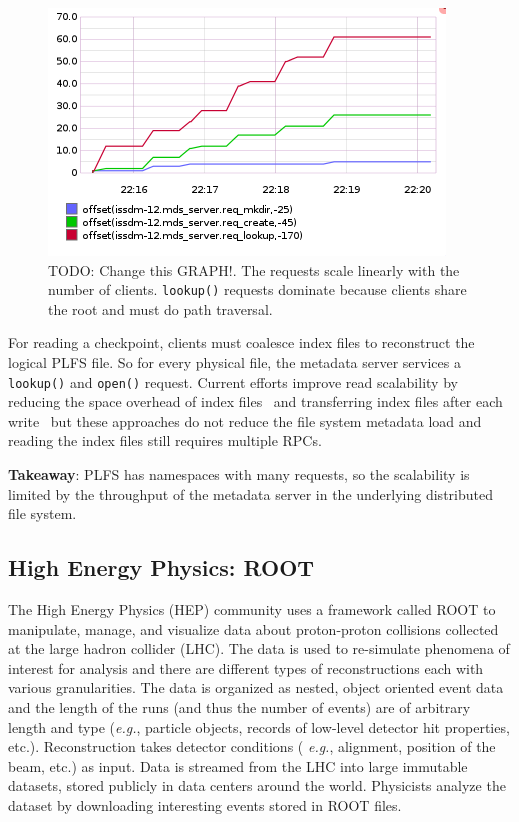 \begin{figure}[tb]
\centering
  \includegraphics[width=1\linewidth]{figures/prob_reqs.png} 
  \caption{TODO: Change this GRAPH!. The requests scale linearly with the
number of clients.  \texttt{lookup()} requests dominate because clients share
the root and must do path traversal.  }\label{fig:prob_reqs}
\end{figure}

For reading a checkpoint, clients must coalesce index files to reconstruct the
logical PLFS file. So for every physical file, the metadata server services a
\texttt{lookup()} and \texttt{open()} request. Current efforts improve read
scalability by reducing the space overhead of index
files~\cite{he:hpdc13-plfs-patterns} and transferring index files after each
write~\cite{grider:pc17-diddlings} but these approaches do not reduce the file
system metadata load and reading the index files still requires multiple RPCs.

\textbf{Takeaway}: PLFS has namespaces with many requests, so the
scalability is limited by the throughput of the metadata server in the
underlying distributed file system. 

\subsection{High Energy Physics: ROOT}

The High Energy Physics (HEP) community uses a framework called ROOT to
manipulate, manage, and visualize data about proton-proton collisions collected
at the large hadron collider (LHC). The data is used to re-simulate phenomena
of interest for analysis and there are different types of reconstructions each
with various granularities. The data is organized as nested, object oriented
event data and the length of the runs (and thus the number of events) are of
arbitrary length and type ({\it e.g.}, particle objects, records of low-level
detector hit properties, etc.).  Reconstruction takes detector conditions ({\it
e.g.}, alignment, position of the beam, etc.) as input.  Data is streamed from
the LHC into large immutable datasets, stored publicly in data centers around
the world.  Physicists analyze the dataset by downloading interesting events
stored in ROOT files.

